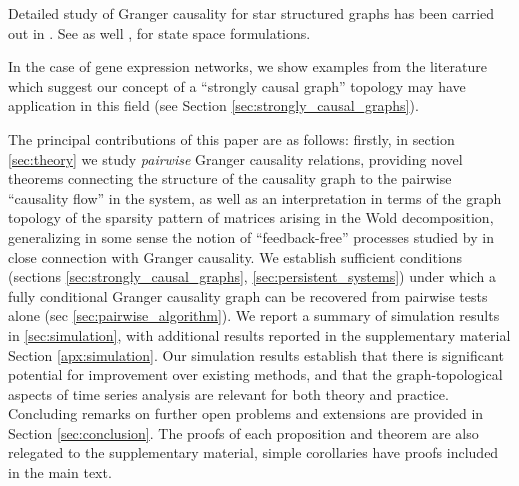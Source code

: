 \documentclass[12pt]{article}
\begin{document}
Detailed study of Granger causality for star structured graphs has
been carried out in \cite{jozsa2018relationship}.  See as well
\cite{barnett2015granger}, \cite{jozsa2018_phd_thesis} for state space
formulations.  

In the case of gene expression networks, we show examples from the
literature which suggest our concept of a ``strongly causal graph''
topology may have application in this field (see Section
\ref{sec:strongly_causal_graphs}).

The principal contributions of this paper are as follows: firstly, in
section \ref{sec:theory} we study \textit{pairwise} Granger causality
relations, providing novel theorems connecting the structure of the
causality graph to the pairwise ``causality flow'' in the system, as
well as an interpretation in terms of the graph topology of the
sparsity pattern of matrices arising in the Wold decomposition,
generalizing in some sense the notion of ``feedback-free'' processes
studied by \cite{caines1975feedback} in close connection with
Granger causality.  We establish sufficient conditions (sections
\ref{sec:strongly_causal_graphs}, \ref{sec:persistent_systems}) under
which a fully conditional Granger causality graph can be recovered
from pairwise tests alone (sec \ref{sec:pairwise_algorithm}).  We
report a summary of simulation results in \ref{sec:simulation}, with
additional results reported in the supplementary material Section
\ref{apx:simulation}.  Our simulation results establish that there is
significant potential for improvement over existing methods, and that
the graph-topological aspects of time series analysis are relevant for
both theory and practice.  Concluding remarks on further open problems
and extensions are provided in Section \ref{sec:conclusion}.  The
proofs of each proposition and theorem are also relegated to the
supplementary material, simple corollaries have proofs included in the
main text.

\end{document}
